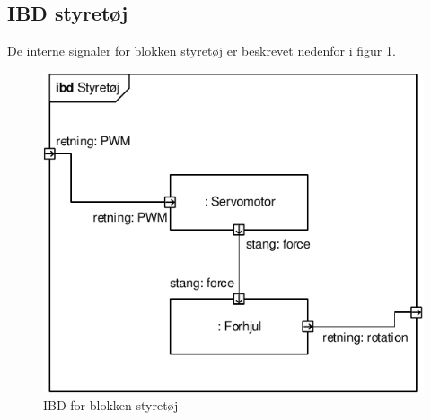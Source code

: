 \subsection{IBD styretøj}

De interne signaler for blokken styretøj er beskrevet nedenfor i figur \ref{fig:ibd_styretoej}.

\begin{figure}[h]
\centering
\includegraphics[scale=1]{../fig/diagrammer/bil/ibd_styretoej.pdf}
\caption{IBD for blokken styretøj}
\label{fig:ibd_styretoej}
\end{figure}


\clearpage


